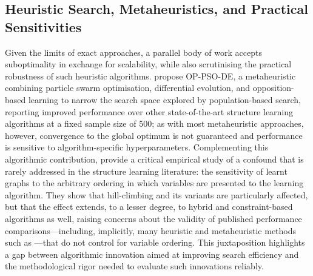 \subsection{Heuristic Search, Metaheuristics, and Practical Sensitivities}
Given the limits of exact approaches, a parallel body of work accepts suboptimality in exchange for scalability, while also scrutinising the practical robustness of such heuristic algorithms. \cite{sun2025bayesian} propose OP-PSO-DE, a metaheuristic combining particle swarm optimisation, differential evolution, and opposition-based learning to narrow the search space explored by population-based search, reporting improved performance over other state-of-the-art structure learning algorithms at a fixed sample size of 500; as with most metaheuristic approaches, however, convergence to the global optimum is not guaranteed and performance is sensitive to algorithm-specific hyperparameters. Complementing this algorithmic contribution, \cite{kitson2024impact} provide a critical empirical study of a confound that is rarely addressed in the structure learning literature: the sensitivity of learnt graphs to the arbitrary ordering in which variables are presented to the learning algorithm. They show that hill-climbing and its variants are particularly affected, but that the effect extends, to a lesser degree, to hybrid and constraint-based algorithms as well, raising concerns about the validity of published performance comparisons---including, implicitly, many heuristic and metaheuristic methods such as \cite{sun2025bayesian}---that do not control for variable ordering. This juxtaposition highlights a gap between algorithmic innovation aimed at improving search efficiency and the methodological rigor needed to evaluate such innovations reliably.

